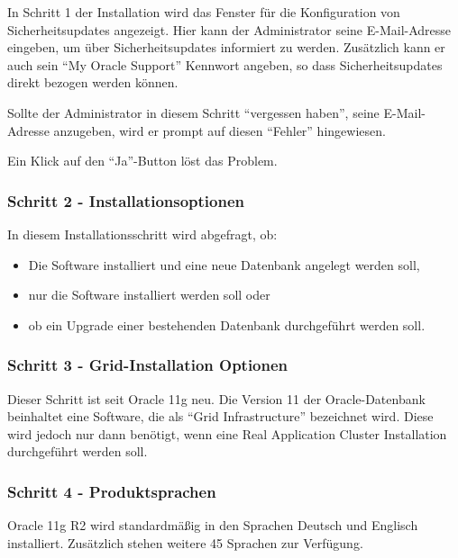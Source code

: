 \clearpage
          In Schritt 1  der Installation wird das Fenster f\"ur die Konfiguration von Sicherheitsupdates angezeigt. Hier kann der Administrator seine E-Mail-Adresse eingeben, um \"uber Sicherheitsupdates informiert zu werden. Zus\"atzlich kann er auch sein \enquote{My Oracle Support} Kennwort angeben, so dass Sicherheitsupdates direkt bezogen werden k\"onnen.

          Sollte der Administrator in diesem Schritt \enquote{vergessen haben}, seine E-Mail-Adresse anzugeben, wird er prompt auf diesen \enquote{Fehler} hingewiesen.

          Ein Klick auf den \enquote{Ja}-Button l\"ost das Problem.

        \subsubsection{Schritt 2 - Installationsoptionen}
          In diesem Installationsschritt wird abgefragt, ob:
          \begin{itemize}
            \item Die Software installiert und eine neue Datenbank angelegt werden soll,
            \item nur die Software installiert werden soll oder
            \item ob ein Upgrade einer bestehenden Datenbank durchgef\"uhrt werden soll.
          \end{itemize}
        \subsubsection{Schritt 3 - Grid-Installation Optionen}
          Dieser Schritt ist seit Oracle 11g neu. Die Version 11 der Oracle-Datenbank beinhaltet eine Software, die als \enquote{Grid Infrastructure} bezeichnet wird. Diese wird jedoch nur dann ben\"otigt, wenn eine Real Application Cluster Installation durchgef\"uhrt werden soll.
        \subsubsection{Schritt 4 - Produktsprachen}
          Oracle 11g R2 wird standardm\"a\ss{}ig in den Sprachen Deutsch und Englisch installiert. Zus\"atzlich stehen weitere 45 Sprachen zur Verf\"ugung.
